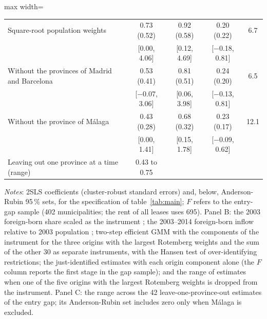 \begin{table}[!htbp]
\begin{adjustbox}{max width=\linewidth}
\begin{tabular}{lcccc}
Square-root population weights & 0.73 (0.52) & 0.92 (0.58) & 0.20 (0.22) & 6.7\\
 & {\footnotesize [0.00, 4.06]} & {\footnotesize [0.12, 4.69]} & {\footnotesize [$-$0.18, 0.81]} & \\
Without the provinces of Madrid and Barcelona & 0.53 (0.41) & 0.81 (0.51) & 0.24 (0.20) & 6.5\\
 & {\footnotesize [$-$0.07, 3.06]} & {\footnotesize [0.06, 3.98]} & {\footnotesize [$-$0.13, 0.81]} & \\
Without the province of Málaga & 0.43 (0.28) & 0.68 (0.32) & 0.23 (0.17) & 12.1\\
 & {\footnotesize [0.00, 1.41]} & {\footnotesize [0.15, 1.78]} & {\footnotesize [$-$0.09, 0.62]} & \\
Leaving out one province at a time (range) & 0.43 to 0.75 & & & \\
\bottomrule\end{tabular}\end{adjustbox}
\begin{minipage}{0.97\linewidth}\footnotesize\vspace{4pt}
\textit{Notes}: 2SLS coefficients (cluster-robust standard errors) and, below, Anderson-Rubin 95\,\% sets, for the specification of table~\ref{tab:main}; $F$ refers to the entry-gap sample (402 municipalities; the rent of all leases uses 695). Panel B: the 2003 foreign-born share scaled as the instrument \citep{borusyak2022}; the 2003--2014 foreign-born inflow relative to 2003 population \citep{jaeger2018}; two-step efficient GMM with the components of the instrument for the three origins with the largest Rotemberg weights and the sum of the other 30 as separate instruments, with the Hansen test of over-identifying restrictions; the just-identified estimates with each origin component alone (the $F$ column reports the first stage in the gap sample); and the range of estimates when one of the five origins with the largest Rotemberg weights is dropped from the instrument. Panel C: the range across the 42 leave-one-province-out estimates of the entry gap; its Anderson-Rubin set includes zero only when Málaga is excluded.
\end{minipage}\end{table}